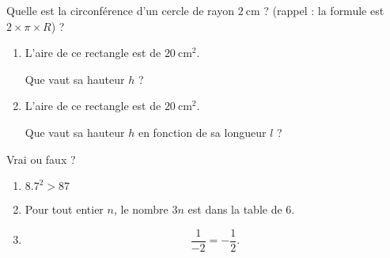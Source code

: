 \begin{MentalActivity}

    \begin{mental}
        Quelle est la circonférence d'un cercle de rayon \( \SI{2}{\centi\meter}\) ? (rappel : la formule est \( 2\times\pi\times R\)) ?
    \end{mental}

    \begin{mental}
        \begin{enumerate}
            \item
                L'aire de ce rectangle est de \(\SI{20}{\centi\meter\squared}\).
        \begin{center}
           
        \end{center}
        Que vaut sa hauteur \( h\) ?
            \item
                L'aire de ce rectangle est de \(\SI{20}{\centi\meter\squared}\).
                \begin{center}
                    
                \end{center}
                Que vaut sa hauteur \( h\) en fonction de sa longueur \( l\) ?
        \end{enumerate}
    \end{mental}

    \begin{mental}
        Vrai ou faux ?
        \begin{enumerate}
            \item
                \( 8.7^2>87\)
            \item
                Pour tout entier \( n\), le nombre \( 3n\) est dans la table de \( 6\).
            \item
                \begin{equation}
                    \frac{1}{ -2 }=-\frac{1}{ 2 }.
                \end{equation}
        \end{enumerate}
    \end{mental}
    
\end{MentalActivity}


